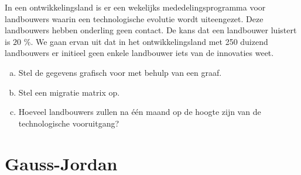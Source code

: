 \documentclass[12pt,twoside]{article}
\begin{document}
\begin{oefening}
In een ontwikkelingsland is er een wekelijks mededelingsprogramma voor landbouwers waarin een technologische evolutie wordt uiteengezet. Deze landbouwers hebben onderling geen contact. De kans dat een landbouwer luistert is $20$ \%. We gaan ervan uit dat in het ontwikkelingsland met 250 duizend landbouwers er initieel geen enkele landbouwer iets van de innovaties weet.

\begin{enumerate}[(a)]
  \item Stel de gegevens grafisch voor met behulp van een graaf.
  \item Stel een migratie matrix op.
  \item Hoeveel landbouwers zullen na één maand op de hoogte zijn van de technologische vooruitgang?
\end{enumerate}
\end{oefening}

\begin{oefening}
\end{oefening}

\begin{oefening}
\end{oefening}

\begin{oefening}
\end{oefening}

\begin{oefening}
\end{oefening}

\pagebreak
\section{Gauss-Jordan}
\end{document}
